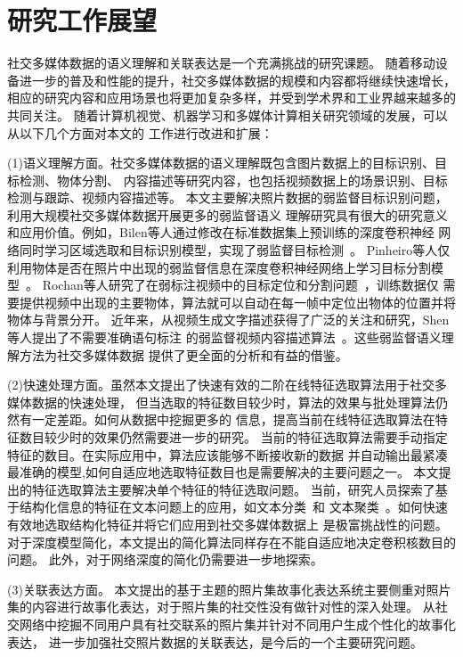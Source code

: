 \documentclass[doctor]{ustcthesis}
\begin{document}
\section{研究工作展望}
社交多媒体数据的语义理解和关联表达是一个充满挑战的研究课题。
随着移动设备进一步的普及和性能的提升，社交多媒体数据的规模和内容都将继续快速增长，
相应的研究内容和应用场景也将更加复杂多样，并受到学术界和工业界越来越多的共同关注。
随着计算机视觉、机器学习和多媒体计算相关研究领域的发展，可以从以下几个方面对本文的
工作进行改进和扩展：

(1)语义理解方面。社交多媒体数据的语义理解既包含图片数据上的目标识别、目标检测、物体分割、
内容描述等研究内容，也包括视频数据上的场景识别、目标检测与跟踪、视频内容描述等。
本文主要解决照片数据的弱监督目标识别问题，利用大规模社交多媒体数据开展更多的弱监督语义
理解研究具有很大的研究意义和应用价值。例如，Bilen等人通过修改在标准数据集上预训练的深度卷积神经
网络同时学习区域选取和目标识别模型，实现了弱监督目标检测~\cite{Bilen_2016_CVPR}。
Pinheiro等人仅利用物体是否在照片中出现的弱监督信息在深度卷积神经网络上学习目标分割模型~\cite{pinheiro2014weakly}。
Rochan等人研究了在弱标注视频中的目标定位和分割问题~\cite{rochan2016weakly}，训练数据仅
需要提供视频中出现的主要物体，算法就可以自动在每一帧中定位出物体的位置并将物体与背景分开。
近年来，从视频生成文字描述获得了广泛的关注和研究，Shen等人提出了不需要准确语句标注
的弱监督视频内容描述算法~\cite{shen2017weakly}。这些弱监督语义理解方法为社交多媒体数据
提供了更全面的分析和有益的借鉴。

(2)快速处理方面。虽然本文提出了快速有效的二阶在线特征选取算法用于社交多媒体数据的快速处理，
但当选取的特征数目较少时，算法的效果与批处理算法仍然有一定差距。如何从数据中挖掘更多的
信息，提高当前在线特征选取算法在特征数目较少时的效果仍然需要进一步的研究。
当前的特征选取算法需要手动指定特征的数目。在实际应用中，算法应该能够不断接收新的数据
并自动输出最紧凑最准确的模型,如何自适应地选取特征数目也是需要解决的主要问题之一。
本文提出的特征选取算法主要解决单个特征的特征选取问题。
当前，研究人员探索了基于结构化信息的特征在文本问题上的应用，如文本分类~\cite{Wang2016TCH}和
文本聚类~\cite{Wang2015IWK}。如何快速有效地选取结构化特征并将它们应用到社交多媒体数据上
是极富挑战性的问题。对于深度模型简化，本文提出的简化算法同样存在不能自适应地决定卷积核数目的问题。
此外，对于网络深度的简化仍需要进一步地探索。

(3)关联表达方面。
本文提出的基于主题的照片集故事化表达系统主要侧重对照片集的内容进行故事化表达，对于照片集的社交性没有做针对性的深入处理。
从社交网络中挖掘不同用户具有社交联系的照片集并针对不同用户生成个性化的故事化表达，
进一步加强社交照片数据的关联表达，是今后的一个主要研究问题。
\end{document}
